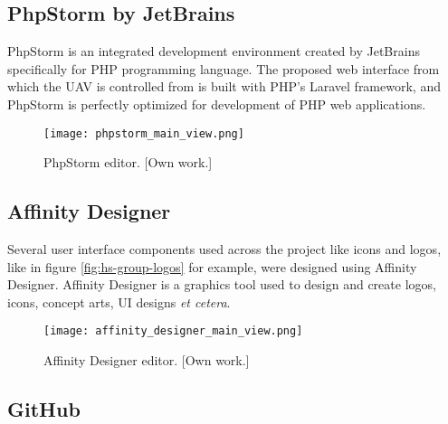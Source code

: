 
\subsection{PhpStorm by JetBrains}
\label{subsec:phpstorm}

PhpStorm is an integrated development environment created by JetBrains specifically for PHP programming language. The proposed web interface from which the UAV is controlled from is built with PHP's Laravel framework, and PhpStorm is perfectly optimized for development of PHP web applications.

\begin{figure}[H]
    \centering \texttt{[image: phpstorm\_main\_view.png]}
    \caption{PhpStorm editor. [Own work.]}
    \label{fig:phpstorm}
\end{figure}




\subsection{Affinity Designer}
\label{subsec:affinity-designer}

Several user interface components used across the project like icons and logos, like in figure \ref{fig:hs-group-logos} for example, were designed using Affinity Designer. Affinity Designer is a graphics tool used to design and create logos, icons, concept arts, UI designs \textit{et cetera}.

\begin{figure}[H]
    \centering \texttt{[image: affinity\_designer\_main\_view.png]}
    \caption{Affinity Designer editor. [Own work.]}
    \label{fig:affinity-designer}
\end{figure}




\subsection{GitHub}
\label{subsec:github}

